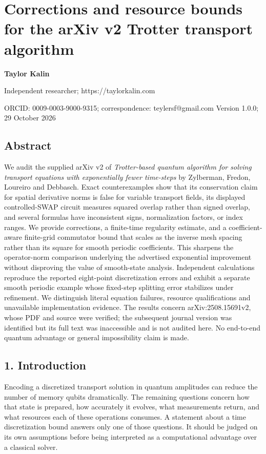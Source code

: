 \section{Corrections and resource bounds for the arXiv v2 Trotter
transport
algorithm}\label{corrections-and-resource-bounds-for-the-arxiv-v2-trotter-transport-algorithm}

\textbf{Taylor Kalin}

Independent researcher; https://taylorkalin.com

ORCID: 0009-0003-9000-9315; correspondence: teylersf@gmail.com Version
1.0.0; 29 October 2026

\subsection{Abstract}\label{abstract}

We audit the supplied arXiv v2 of \emph{Trotter-based quantum algorithm
for solving transport equations with exponentially fewer time-steps} by
Zylberman, Fredon, Loureiro and Debbasch. Exact counterexamples show
that its conservation claim for spatial derivative norms is false for
variable transport fields, its displayed controlled-SWAP circuit
measures squared overlap rather than signed overlap, and several
formulas have inconsistent signs, normalization factors, or index
ranges. We provide corrections, a finite-time regularity estimate, and a
coefficient-aware finite-grid commutator bound that scales as the
inverse mesh spacing rather than its square for smooth periodic
coefficients. This sharpens the operator-norm comparison underlying the
advertised exponential improvement without disproving the value of
smooth-state analysis. Independent calculations reproduce the reported
eight-point discretization errors and exhibit a separate smooth periodic
example whose fixed-step splitting error stabilizes under refinement. We
distinguish literal equation failures, resource qualifications and
unavailable implementation evidence. The results concern
arXiv:2508.15691v2, whose PDF and source were verified; the subsequent
journal version was identified but its full text was inaccessible and is
not audited here. No end-to-end quantum advantage or general
impossibility claim is made.

\subsection{1. Introduction}\label{introduction}

Encoding a discretized transport solution in quantum amplitudes can
reduce the number of memory qubits dramatically. The remaining questions
concern how that state is prepared, how accurately it evolves, what
measurements return, and what resources each of these operations
consumes. A statement about a time discretization bound answers only one
of those questions. It should be judged on its own assumptions before
being interpreted as a computational advantage over a classical solver.

